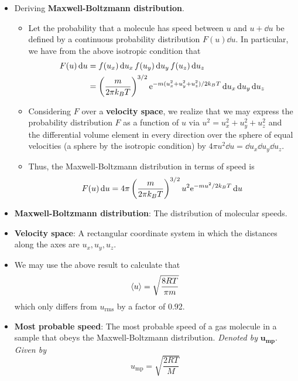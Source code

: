 \documentclass[../notes.tex]{subfiles}
\begin{document}
\begin{itemize}
    \item Deriving \textbf{Maxwell-Boltzmann distribution}.
    \begin{itemize}
        \item Let the probability that a molecule has speed between $u$ and $u+\dd{u}$ be defined by a continuous probability distribution $F(u)\dd{u}$. In particular, we have from the above isotropic condition that
        \begin{align*}
            F(u)\dd{u} &= f(u_x)\dd{u_x}f(u_y)\dd{u_y}f(u_z)\dd{u_z}\\
            &= \left( \frac{m}{2\pi k_BT} \right)^{3/2}\e[-m(u_x^2+u_y^2+u_z^2)/2k_BT]\dd{u_x}\dd{u_y}\dd{u_z}
        \end{align*}
        \item Considering $F$ over a \textbf{velocity space}, we realize that we may express the probability distribution $F$ as a function of $u$ via $u^2=u_x^2+u_y^2+u_z^2$ and the differential volume element in every direction over the sphere of equal velocities (a sphere by the isotropic condition) by $4\pi u^2\dd{u}=\dd{u_x}\dd{u_y}\dd{u_z}$.
        \item Thus, the Maxwell-Boltzmann distribution in terms of speed is
        \begin{equation*}
            F(u)\dd{u} = 4\pi\left( \frac{m}{2\pi k_BT} \right)^{3/2}u^2\e[-mu^2/2k_BT]\dd{u}
        \end{equation*}
    \end{itemize}
    \item \textbf{Maxwell-Boltzmann distribution}: The distribution of molecular speeds.
    \item \textbf{Velocity space}: A rectangular coordinate system in which the distances along the axes are $u_x,u_y,u_z$.
    \item We may use the above result to calculate that
    \begin{equation*}
        \prb{u} = \sqrt{\frac{8RT}{\pi m}}
    \end{equation*}
    which only differs from $u_\text{rms}$ by a factor of 0.92.
    \item \textbf{Most probable speed}: The most probable speed of a gas molecule in a sample that obeys the Maxwell-Boltzmann distribution. \emph{Denoted by} $\bm{u_\text{mp}}$. \emph{Given by}
    \begin{equation*}
        u_\text{mp} = \sqrt{\frac{2RT}{M}}
    \end{equation*}
    \begin{itemize}

\end{itemize}
\end{itemize}
\end{document}

